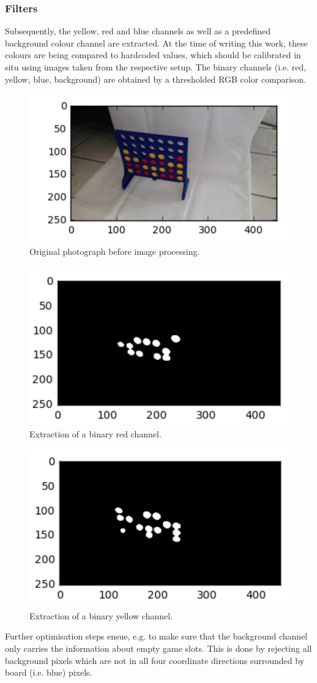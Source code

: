 \documentclass[10pt,twocolumn,letterpaper]{article}
\begin{document}
\subsubsection{Filters}
Subsequently, the yellow, red and blue channels as well as a predefined background colour channel are extracted. At the time of writing this work, these colours are being compared to hardcoded values, which should be calibrated in situ using images taken from the respective setup.
The binary channels (i.e. red, yellow, blue, background) are obtained by a thresholded RGB color comparison.
\begin{figure}[bh]
  \centering
  \includegraphics[width = .3\textwidth]{figures/camera.png}
  \caption{Original photograph before image processing.}
  \label{fig:capturedImage}
\end{figure}
\begin{figure}[bh]
  \centering
  \includegraphics[width = .3\textwidth]{figures/redChannel.png}
  \caption{Extraction of a binary red channel.}
  \label{fig:redChannel}
\end{figure}
\begin{figure}[bh]
  \centering
  \includegraphics[width = .3\textwidth]{figures/yellowChannel.png}
  \caption{Extraction of a binary yellow channel.}
  \label{fig:yellowChannel}
\end{figure}
Further optimisation steps ensue, e.g. to make sure that the background channel only carries the information about empty game slots. This is done by rejecting all background pixels which are not in all four coordinate directions surrounded by board (i.e. blue) pixels.
\end{document}
